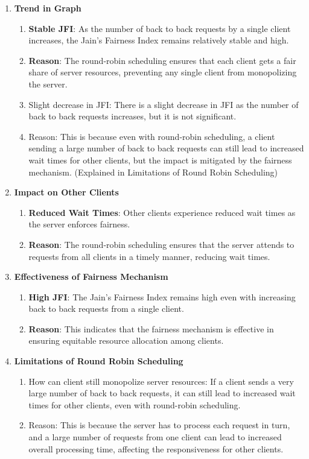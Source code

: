 \documentclass[12pt]{article}
\begin{document}
\begin{enumerate}
    \item \textbf{Trend in Graph}
    \begin{enumerate}
        \item \textbf{Stable JFI}: As the number of back to back requests by a single client increases, the Jain's Fairness Index remains relatively stable and high.
        \item \textbf{Reason}: The round-robin scheduling ensures that each client gets a fair share of server resources, preventing any single client from monopolizing the server.
        \item Slight decrease in JFI: There is a slight decrease in JFI as the number of back to back requests increases, but it is not significant.
        \item Reason: This is because even with round-robin scheduling, a client sending a large number of back to back requests can still lead to increased wait times for other clients, but the impact is mitigated by the fairness mechanism. (Explained in Limitations of Round Robin Scheduling)
    \end{enumerate}
    \item \textbf{Impact on Other Clients}
    \begin{enumerate}
        \item \textbf{Reduced Wait Times}: Other clients experience reduced wait times as the server enforces fairness.
        \item \textbf{Reason}: The round-robin scheduling ensures that the server attends to requests from all clients in a timely manner, reducing wait times.
    \end{enumerate}
    \item \textbf{Effectiveness of Fairness Mechanism}
    \begin{enumerate}
        \item \textbf{High JFI}: The Jain's Fairness Index remains high even with increasing back to back requests from a single client.
        \item \textbf{Reason}: This indicates that the fairness mechanism is effective in ensuring equitable resource allocation among clients.
    \end{enumerate}
    \item \textbf{Limitations of Round Robin Scheduling}
    \begin{enumerate}
        \item How can client still monopolize server resources: If a client sends a very large number of back to back requests, it can still lead to increased wait times for other clients, even with round-robin scheduling.
        \item Reason: This is because the server has to process each request in turn, and a large number of requests from one client can lead to increased overall processing time, affecting the responsiveness for other clients.
    \end{enumerate}
\end{enumerate}

\end{document}
